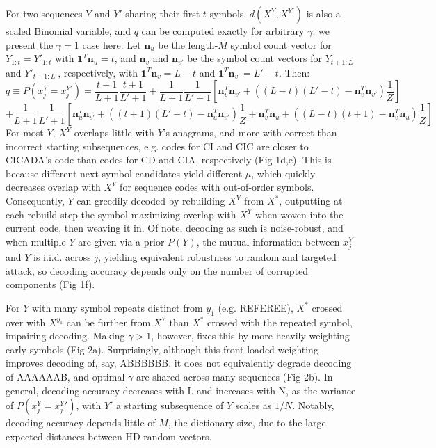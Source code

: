 \documentclass{article}
\begin{document}
For two sequences $Y$ and $Y'$ sharing their first $t$ symbols, $d(X^Y, X^{Y'})$ is also a scaled Binomial variable, and $q$ can be computed exactly for arbitrary $\gamma$; we present the $\gamma = 1$ case here. Let $\mathbf{n}_u$ be the length-$M$ symbol count vector for $Y_{1:t} = Y'_{1:t}$ with $\mathbf{1}^T\mathbf{n}_u = t$, and $\mathbf{n}_v$ and $\mathbf{n}_{v'}$ be the symbol count vectors for $Y_{t+1:L}$ and $Y'_{t+1:L'}$, respectively, with $\mathbf{1}^T\mathbf{n}_{v} = L - t$ and $\mathbf{1}^T\mathbf{n}_{v'} = L' - t$. Then:
$$q \equiv P(x_j^Y = x_j^{Y'}) = \frac{t+1}{L+1}\frac{t+1}{L'+1} + \frac{1}{L+1}\frac{1}{L'+1}\left[\mathbf{n}^T_v\mathbf{n}_{v'} + \left((L-t)(L'-t) - \mathbf{n}^T_v\mathbf{n}_{v'} \right)\frac{1}{Z}\right]$$
$$+\frac{1}{L+1}\frac{1}{L'+1}\left[
\mathbf{n}^T_{u}\mathbf{n}_{v'} + \left((t+1)(L'-t) - \mathbf{n}^T_{u}\mathbf{n}_{v'} \right)\frac{1}{Z}
+ \mathbf{n}^T_{v}\mathbf{n}_{u} + \left((L-t)(t+1) - \mathbf{n}^T_{v}\mathbf{n}_{u} \right)\frac{1}{Z}
\right]$$
For most $Y$, $X^Y$ overlaps little with $Y$'s anagrams, and more with correct than incorrect starting subsequences, e.g. codes for CI and CIC are closer to CICADA's code than codes for CD and CIA, respectively (Fig 1d,e). This is because different next-symbol candidates yield different $\mu$, which quickly decreases overlap with $X^Y$ for sequence codes with out-of-order symbols. Consequently, $Y$ can greedily decoded by rebuilding $X^Y$ from $X^*$, outputting at each rebuild step the symbol maximizing overlap with $X^Y$ when woven into the current code, then weaving it in. Of note, decoding as such is noise-robust, and when multiple $Y$ are given via a prior $P(Y)$, the mutual information between $x_j^Y$ and $Y$ is i.i.d. across $j$, yielding equivalent robustness to random and targeted attack, so decoding accuracy depends only on the number of corrupted components (Fig 1f).

For $Y$ with many symbol repeats distinct from $y_1$ (e.g. REFEREE), $X^*$ crossed over with $X^{y_1}$ can be further from $X^Y$ than $X^*$ crossed with the repeated symbol, impairing decoding. Making $\gamma > 1$, however, fixes this by more heavily weighting early symbols (Fig 2a). Surprisingly, although this front-loaded weighting improves decoding of, say, ABBBBBB, it does not equivalently degrade decoding of AAAAAAB, and optimal $\gamma$ are shared across many sequences (Fig 2b). In general, decoding accuracy decreases with L and increases with N, as the variance of $P(x_j^Y = x_j^Y')$, with $Y'$ a starting subsequence of $Y$ scales as $1/N$. Notably, decoding accuracy depends little of $M$, the dictionary size, due to the large expected distances between HD random vectors.
\end{document}
